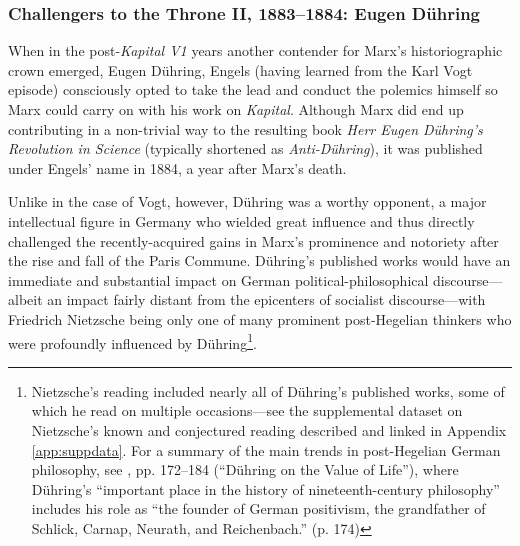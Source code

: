\subsubsection{Challengers to the Throne II, 1883--1884: Eugen Dühring\label{sec:duhring}}

When in the post-\textit{Kapital V1} years another contender for Marx's historiographic crown emerged, Eugen Dühring, Engels (having learned from the Karl Vogt episode) consciously opted to take the lead and conduct the polemics himself so Marx could carry on with his work on \textit{Kapital}. Although Marx did end up contributing in a non-trivial way to the resulting book \textit{Herr Eugen Dühring's Revolution in Science} (typically shortened as \textit{Anti-Dühring}), it was published under Engels' name in 1884, a year after Marx's death.

Unlike in the case of Vogt, however, Dühring was a worthy opponent, a major intellectual figure in Germany who wielded great influence and thus directly challenged the recently-acquired gains in Marx's prominence and notoriety after the rise and fall of the Paris Commune. Dühring's published works would have an immediate and substantial impact on German political-philosophical discourse---albeit an impact fairly distant from the epicenters of socialist discourse---with Friedrich Nietzsche being only one of many prominent post-Hegelian thinkers who were profoundly influenced by Dühring\footnote{Nietzsche's reading included nearly all of Dühring's published works, some of which he read on multiple occasions---see the supplemental dataset on Nietzsche's known and conjectured reading described and linked in Appendix \ref{app:suppdata}. For a summary of the main trends in post-Hegelian German philosophy, see \cite{beiser_after_2014}, pp. 172--184 (``Dühring on the Value of Life''), where Dühring's ``important place in the history of nineteenth-century philosophy'' includes his role as ``the founder of  German positivism, the grandfather of Schlick, Carnap, Neurath, and Reichenbach.'' (p. 174)}.
